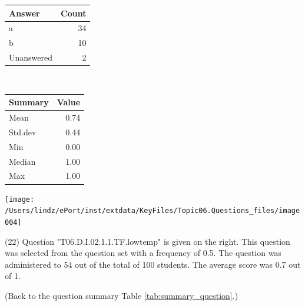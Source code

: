 \documentclass[12pt,nohyper]{tufte-handout}\usepackage[]{graphicx}\usepackage[]{color}
\begin{document}
\begin{center}%
\begin{tabular}{lr}
  \hline
Answer & Count \\ 
  \hline
a &  34 \\ 
  b &  10 \\ 
  Unanswered &   2 \\ 
   \hline
\end{tabular}
~~~~~~~~%
\begin{tabular}{lr}
  \hline
Summary & Value \\ 
  \hline
Mean & 0.74 \\ 
  Std.dev & 0.44 \\ 
  Min & 0.00 \\ 
  Median & 1.00 \\ 
  Max & 1.00 \\ 
   \hline
\end{tabular}
\end{center}\newpage{}



\vspace{5cm}\begin{marginfigure}\texttt{[image: /Users/lindz/ePort/inst/extdata/KeyFiles/Topic06.Questions\_files/image004]}\end{marginfigure}\vspace{-5cm} (22) Question "T06.D.I.02.1.1.TF.lowtemp" is given on the right. This question was selected from the question set with a frequency of 0.5. The question was administered to 54 out of the total of 100 students. The average score was 0.7 out of 1.

 (Back to the question summary Table \ref{tab:summary_question}.)
\end{document}
